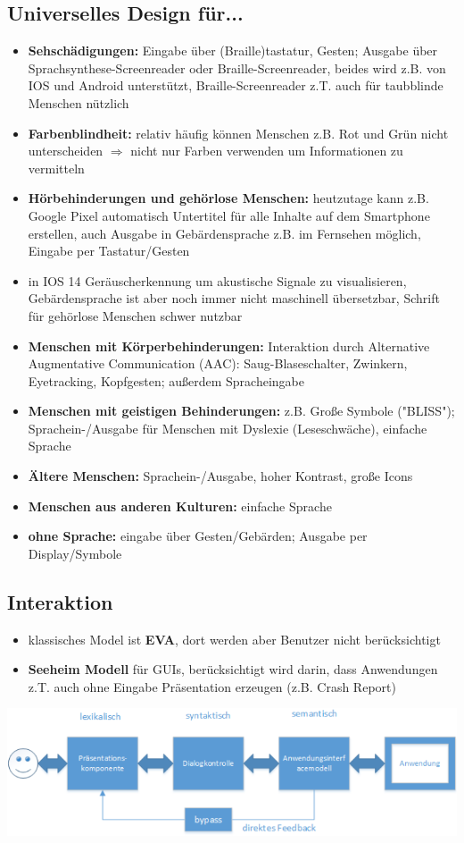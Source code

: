 \documentclass[12pt,landscape]{article}
\begin{document}
\begin{multicols}{3}
\subsection{Universelles Design für...}
\begin{itemize}
\item \textbf{Sehschädigungen:} Eingabe über (Braille)tastatur, Gesten; Ausgabe über Sprachsynthese-Screenreader oder Braille-Screenreader, beides wird z.B. von IOS und Android unterstützt, Braille-Screenreader z.T. auch für taubblinde Menschen nützlich
\item \textbf{Farbenblindheit:} relativ häufig können Menschen z.B. Rot und Grün nicht unterscheiden $\Rightarrow$ nicht nur Farben verwenden um Informationen zu vermitteln
\item \textbf{Hörbehinderungen und gehörlose Menschen:} heutzutage kann z.B. Google Pixel automatisch Untertitel für alle Inhalte auf dem Smartphone erstellen, auch Ausgabe in Gebärdensprache z.B. im Fernsehen möglich, Eingabe per Tastatur/Gesten
\item in IOS 14 Geräuscherkennung um akustische Signale zu visualisieren, Gebärdensprache ist aber noch immer nicht maschinell übersetzbar, Schrift für gehörlose Menschen schwer nutzbar
\item \textbf{Menschen mit Körperbehinderungen:} Interaktion durch Alternative Augmentative Communication (AAC): Saug-Blaseschalter, Zwinkern, Eyetracking, Kopfgesten; außerdem Spracheingabe 
\item \textbf{Menschen mit geistigen Behinderungen:} z.B. Große Symbole ("BLISS"); Sprachein-/Ausgabe für Menschen mit Dyslexie (Leseschwäche), einfache Sprache 
\item \textbf{Ältere Menschen:} Sprachein-/Ausgabe, hoher Kontrast, große Icons
\item \textbf{Menschen aus anderen Kulturen:} einfache Sprache 
\item \textbf{ohne Sprache:} eingabe über Gesten/Gebärden; Ausgabe per Display/Symbole 
\end{itemize}
\subsection{Interaktion}
\begin{itemize}
\item klassisches Model ist \textbf{EVA}, dort werden aber Benutzer nicht berücksichtigt
\item \textbf{Seeheim Modell} für GUIs, berücksichtigt wird darin, dass Anwendungen z.T. auch ohne Eingabe Präsentation erzeugen (z.B. Crash Report)
\end{itemize}
\includegraphics[scale=0.65]{Seeheim.PNG}


\end{multicols}
\end{document}
